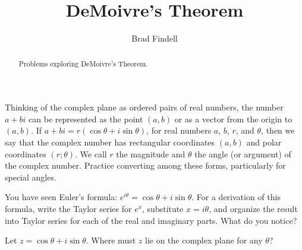 \documentclass[handout,space,nooutcomes]{ximera}
\title{DeMoivre's Theorem}
\author{Brad Findell}
\begin{document}
\begin{abstract}
Problems exploring DeMoivre's Theorem.   
\end{abstract}
\maketitle




Thinking of the complex plane as ordered pairs of real numbers, the number $a+bi$ can be represented as the point $(a,b)$ or as a vector from the origin to
$(a,b)$.  If $a+bi = r(\cos\theta +i\sin\theta)$, for real numbers $a$, $b$, $r$, and $\theta$, then we say that the complex number has rectangular coordinates $(a,b)$ and polar coordinates $(r;\theta)$. We call $r$ the magnitude and $\theta$ the angle (or argument) of the complex number. Practice converting among these forms, particularly for special angles.

\begin{problem}
You have seen Euler's formula: $e^{i\theta}=\cos\theta +i\sin\theta$.  For a derivation of this formula, write the Taylor series for $e^{x}$, substitute $x=i\theta$, and organize the result into Taylor series for each of the real and imaginary parts.  What do you notice?  

\end{problem}

\begin{problem}
Let $z = \cos\theta +i\sin\theta$.  Where must $z$ lie on the complex plane for any $\theta$?
\end{problem}

\end{document}
